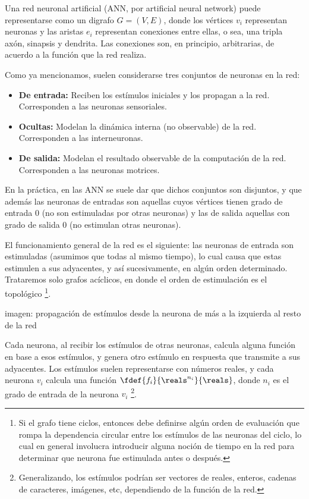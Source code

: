 

Una red neuronal artificial (ANN, por artificial neural network) puede representarse como un digrafo $G=(V,E)$, donde los vértices $v_i$ representan neuronas y las aristas $e_i$ representan conexiones entre ellas, o sea, una tripla axón, sinapsis y dendrita. Las conexiones son, en principio, arbitrarias, de acuerdo a la función que la red realiza.


Como ya mencionamos, suelen considerarse tres conjuntos de neuronas en la red:

\begin{itemize}
\item \textbf{De entrada:} Reciben los estímulos iniciales y los propagan a la red. Corresponden a las neuronas sensoriales.
\item \textbf{Ocultas:} Modelan la dinámica interna (no observable) de la red. Corresponden a las interneuronas.
\item \textbf{De salida:} Modelan el resultado observable de la computación de la red. Corresponden a las neuronas motrices.
\end{itemize}


En la práctica, en las ANN se suele dar que dichos conjuntos son disjuntos, y que además las neuronas de entradas son aquellas cuyos vértices tienen grado de entrada $0$ (no son estimuladas por otras neuronas) y las de salida aquellas con grado de salida $0$ (no estimulan otras neuronas).


El funcionamiento general de la red es el siguiente: las neuronas de entrada son estimuladas (asumimos que todas al mismo tiempo), lo cual causa que estas estimulen a sus adyacentes, y así sucesivamente, en algún orden determinado. Trataremos solo grafos acíclicos, en donde el orden de estimulación es el topológico \footnote{Si el grafo tiene ciclos, entonces debe definirse algún orden de evaluación que rompa la dependencia circular entre los estímulos de las neuronas del ciclo, lo cual en general involucra introducir alguna noción de tiempo en la red para determinar que neurona fue estimulada antes o después.}. 

imagen: propagación de estímulos desde la neurona de más a la izquierda al resto de la red

Cada neurona, al recibir los estímulos de otras neuronas, calcula alguna función en base a esos estímulos, y genera otro estímulo en respuesta que transmite a sus adyacentes. Los estímulos suelen representarse con números reales, y cada neurona $v_i$ calcula una función $\fdef{f_i}{\reals^{n_i}}{\reals}$, donde $n_i$ es el grado de entrada de la neurona $v_i$ \footnote{Generalizando, los estímulos podrían ser vectores de reales, enteros, cadenas de caracteres, imágenes, etc, dependiendo de la función de la red.}.



